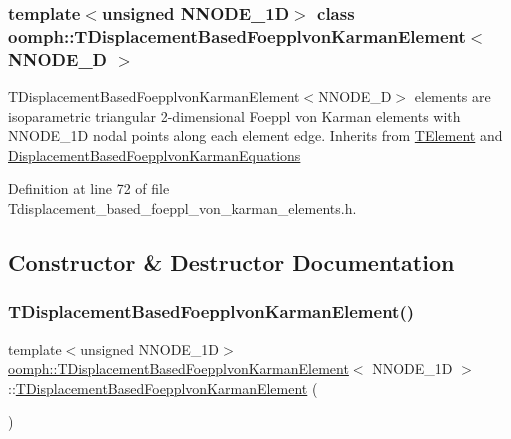 \subsubsection*{template$<$unsigned N\+N\+O\+D\+E\+\_\+1D$>$\newline
class oomph\+::\+T\+Displacement\+Based\+Foepplvon\+Karman\+Element$<$ N\+N\+O\+D\+E\+\_\+D $>$}

T\+Displacement\+Based\+Foepplvon\+Karman\+Element$<$\+N\+N\+O\+D\+E\+\_\+D$>$ elements are isoparametric triangular 2-\/dimensional Foeppl von Karman elements with N\+N\+O\+D\+E\+\_\+1D nodal points along each element edge. Inherits from \hyperlink{classoomph_1_1TElement}{T\+Element} and \hyperlink{classoomph_1_1DisplacementBasedFoepplvonKarmanEquations}{Displacement\+Based\+Foepplvon\+Karman\+Equations} 

Definition at line 72 of file Tdisplacement\+\_\+based\+\_\+foeppl\+\_\+von\+\_\+karman\+\_\+elements.\+h.



\subsection{Constructor \& Destructor Documentation}
\mbox{\label{classoomph_1_1TDisplacementBasedFoepplvonKarmanElement_a076673af7606f66f5e2da7a8ffa80949}} 
\subsubsection{\texorpdfstring{T\+Displacement\+Based\+Foepplvon\+Karman\+Element()}{TDisplacementBasedFoepplvonKarmanElement()}\hspace{0.1cm}{\footnotesize\ttfamily [1/2]}}
{\footnotesize\ttfamily template$<$unsigned N\+N\+O\+D\+E\+\_\+1D$>$ \\
\hyperlink{classoomph_1_1TDisplacementBasedFoepplvonKarmanElement}{oomph\+::\+T\+Displacement\+Based\+Foepplvon\+Karman\+Element}$<$ N\+N\+O\+D\+E\+\_\+1D $>$\+::\hyperlink{classoomph_1_1TDisplacementBasedFoepplvonKarmanElement}{T\+Displacement\+Based\+Foepplvon\+Karman\+Element} (\begin{DoxyParamCaption}{ }\end{DoxyParamCaption})\hspace{0.3cm}{\ttfamily [inline]}}



